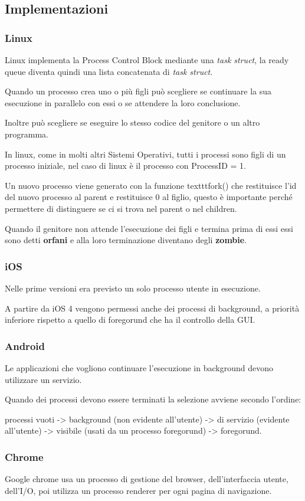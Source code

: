 \subsection{Implementazioni}
\subsubsection{Linux}
Linux implementa la Process Control Block mediante una \textit{task struct}, la ready queue diventa quindi una lista concatenata di \textit{task struct}.

\spacer
Quando un processo crea uno o più figli può scegliere se continuare la sua esecuzione in parallelo con essi o se attendere la loro conclusione.

Inoltre può scegliere se eseguire lo stesso codice del genitore o un altro programma.

\spacer
In linux, come in molti altri Sistemi Operativi, tutti i processi sono figli di un processo iniziale, nel caso di linux è il processo con ProcessID = 1.

Un nuovo processo viene generato con la funzione texttt{fork()} che restituisce l'id del nuovo processo al parent e restituisce 0 al figlio, questo è importante perché permettere di distinguere se ci si trova nel parent o nel children.

Quando il genitore non attende l'esecuzione dei figli e termina prima di essi essi sono detti \textbf{orfani} e alla loro terminazione diventano degli \textbf{zombie}.

\subsubsection{iOS}
Nelle prime versioni era previsto un solo processo utente in esecuzione.

A partire da iOS 4 vengono permessi anche dei processi di background, a priorità inferiore rispetto a quello di foregorund che ha il controllo della GUI.

\subsubsection{Android}
Le applicazioni che vogliono continuare l'esecuzione in background devono utilizzare un servizio.

\spacer
Quando dei processi devono essere terminati la selezione avviene secondo l'ordine:

processi vuoti -> background (non evidente all'utente) -> di servizio (evidente all'utente) -> visibile (usati da un processo foregorund) -> foregorund.

\subsubsection{Chrome}
Google chrome usa un processo di gestione del browser, dell'interfaccia utente, dell'I/O, poi utilizza un processo renderer per ogni pagina di navigazione.
